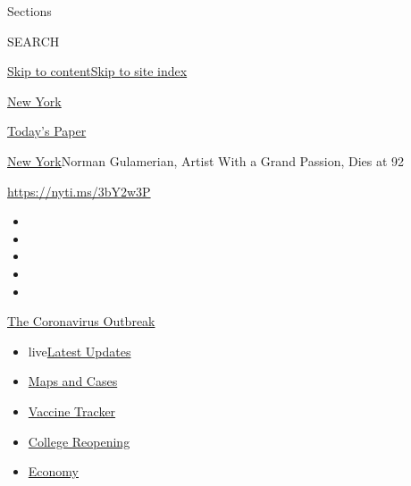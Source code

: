 Sections

SEARCH

\protect\hyperlink{site-content}{Skip to
content}\protect\hyperlink{site-index}{Skip to site index}

\href{https://www.nytimes.com/section/nyregion}{New York}

\href{https://myaccount.nytimes.com/auth/login?response_type=cookie\&client_id=vi}{}

\href{https://www.nytimes.com/section/todayspaper}{Today's Paper}

\href{/section/nyregion}{New York}\textbar{}Norman Gulamerian, Artist
With a Grand Passion, Dies at 92

\url{https://nyti.ms/3bY2w3P}

\begin{itemize}
\item
\item
\item
\item
\item
\end{itemize}

\href{https://www.nytimes.com/news-event/coronavirus?action=click\&pgtype=Article\&state=default\&region=TOP_BANNER\&context=storylines_menu}{The
Coronavirus Outbreak}

\begin{itemize}
\tightlist
\item
  live\href{https://www.nytimes.com/2020/08/03/world/coronavirus-covid-19.html?action=click\&pgtype=Article\&state=default\&region=TOP_BANNER\&context=storylines_menu}{Latest
  Updates}
\item
  \href{https://www.nytimes.com/interactive/2020/us/coronavirus-us-cases.html?action=click\&pgtype=Article\&state=default\&region=TOP_BANNER\&context=storylines_menu}{Maps
  and Cases}
\item
  \href{https://www.nytimes.com/interactive/2020/science/coronavirus-vaccine-tracker.html?action=click\&pgtype=Article\&state=default\&region=TOP_BANNER\&context=storylines_menu}{Vaccine
  Tracker}
\item
  \href{https://www.nytimes.com/2020/08/02/us/covid-college-reopening.html?action=click\&pgtype=Article\&state=default\&region=TOP_BANNER\&context=storylines_menu}{College
  Reopening}
\item
  \href{https://www.nytimes.com/live/2020/08/03/business/stock-market-today-coronavirus?action=click\&pgtype=Article\&state=default\&region=TOP_BANNER\&context=storylines_menu}{Economy}
\end{itemize}

